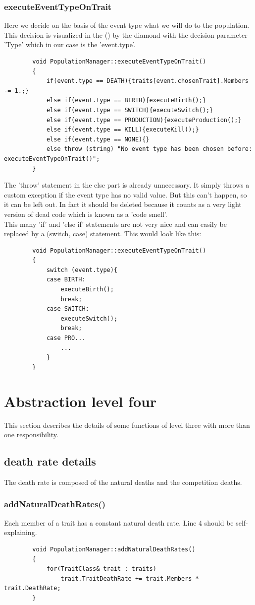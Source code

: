 \documentclass[a4paper,10pt]{scrartcl}
\begin{document}
		\subsubsection{executeEventTypeOnTrait} \label{subsubsec:executeEvOnTr}
		Here we decide on the basis of the event type what we will do to the population. This decision is visualized in the () by the diamond with the decision parameter 'Type' which in our case is the 'event.type'.
		\begin{lstlisting}
		void PopulationManager::executeEventTypeOnTrait()
		{
		    if(event.type == DEATH){traits[event.chosenTrait].Members -= 1.;}
		    else if(event.type == BIRTH){executeBirth();}  
		    else if(event.type == SWITCH){executeSwitch();} 
		    else if(event.type == PRODUCTION){executeProduction();} 
		    else if(event.type == KILL){executeKill();}   
		    else if(event.type == NONE){}
		    else throw (string) "No event type has been chosen before: executeEventTypeOnTrait()";
		}
		\end{lstlisting}
		The 'throw' statement in the else part is already unnecessary. It simply throws a custom exception if the event type has no valid value. But this can't happen, so it can be left out. In fact it should be deleted because it counts as a very light version of dead code which is known as a 'code smell'.\\
		This many 'if' and 'else if' statements are not very nice and can easily be replaced by a (switch, case) statement. This would look like this:
		\begin{lstlisting}
		void PopulationManager::executeEventTypeOnTrait()
		{
			switch (event.type){
			case BIRTH:
				executeBirth();
				break;
			case SWITCH:
				executeSwitch();
				break;				
			case PRO...
				...
			}
		}
		\end{lstlisting}
		
\section{Abstraction level four}
This section describes the details of some functions of level three with more than one responsibility.
	\subsection{death rate details}
	The death rate is composed of the natural deaths and the competition deaths.
		\subsubsection{addNaturalDeathRates()}
		Each member of a trait has a constant natural death rate. Line 4 should be self-explaining.
		\begin{lstlisting}
		void PopulationManager::addNaturalDeathRates()
		{
		    for(TraitClass& trait : traits)
		        trait.TraitDeathRate += trait.Members * trait.DeathRate;
		}
		\end{lstlisting}
		
\end{document}
